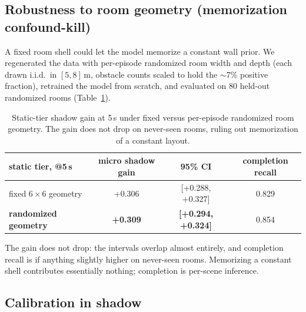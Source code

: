 \documentclass{article}
\begin{document}
\subsection{Robustness to room geometry (memorization confound-kill)}
\label{sec:robustness}

A fixed room shell could let the model memorize a constant wall prior. We regenerated the data with
per-episode randomized room width and depth (each drawn i.i.d.\ in $[5, 8]$\,m, obstacle counts scaled
to hold the ${\sim}$7\% positive fraction), retrained the model from scratch, and evaluated on 80 held-out
randomized rooms (Table~\ref{tab:randomized}).

\begin{table}[t]
  \centering
  \caption{Static-tier shadow gain at 5\,s under fixed versus per-episode randomized room
  geometry. The gain does not drop on never-seen rooms, ruling out memorization of a constant
  layout.}
  \label{tab:randomized}
  \begin{tabular}{lccc}
    \toprule
    static tier, @5\,s & micro shadow gain & 95\% CI & completion recall \\
    \midrule
    fixed $6\times6$ geometry & +0.306 & [+0.288, +0.327] & 0.829 \\
    \textbf{randomized geometry} & \textbf{+0.309} & \textbf{[+0.294, +0.324]} & 0.854 \\
    \bottomrule
  \end{tabular}
\end{table}

The gain does not drop: the intervals overlap almost entirely, and completion recall is if
anything slightly higher on never-seen rooms. Memorizing a constant shell contributes essentially
nothing; completion is per-scene inference.

\subsection{Calibration in shadow}
\label{sec:calibration}
\end{document}
